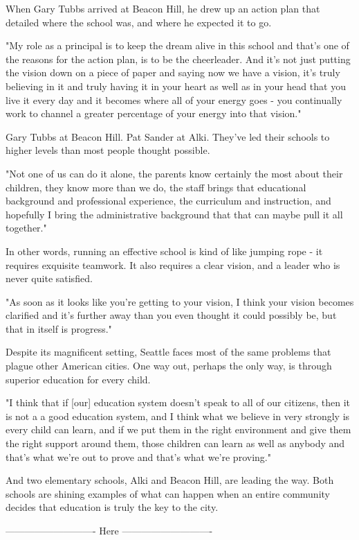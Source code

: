 When Gary Tubbs arrived at Beacon Hill, he drew up an action plan that detailed where the school was, and where he expected it to go.

"My role as a principal is to keep the dream alive in this school and that's one of the reasons for the action plan, is to be the cheerleader. And it's not just putting the vision down on a piece of paper and saying now we have a vision, it's truly believing in it and truly having it in your heart as well as in your head that you live it every day and it becomes where all of your energy goes - you continually work to channel a greater percentage of your energy into that vision."

Gary Tubbs at Beacon Hill. Pat Sander at Alki. They've led their schools to higher levels than most people thought possible.

"Not one of us can do it alone, the parents know certainly the most about their children, they know more than we do, the staff brings that educational background and professional experience, the curriculum and instruction, and hopefully I bring the administrative background that that can maybe pull it all together."

In other words, running an effective school is kind of like jumping rope - it requires exquisite teamwork. It also requires a clear vision, and a leader who is never quite satisfied.

"As soon as it looks like you're getting to your vision, I think your vision becomes clarified and it's further away than you even thought it could possibly be, but that in itself is progress."

Despite its magnificent setting, Seattle faces most of the same problems that plague other American cities. One way out, perhaps the only way, is through superior education for every child.

"I think that if [our] education system doesn't speak to all of our citizens, then it is not a a good education system, and I think what we believe in very strongly is every child can learn, and if we put them in the right environment and give them the right support around them, those children can learn as well as anybody and that's what we're out to prove and that's what we're proving."

And two elementary schools, Alki and Beacon Hill, are leading the way. Both schools are shining examples of what can happen when an entire community decides that education is truly the key to the city.

---------------------------- Here ----------------------------

